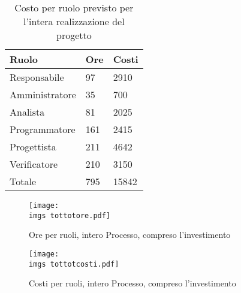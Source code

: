 {	
	\begin{table}[H]
	 \centering
	 \begin{tabular}{p{}p{}
		  	  		  				p{}}
	  \toprule Ruolo & Ore  & Costi \\
	  \midrule
	  Responsabile & 97  & 2910 \\
	  Amministratore & 35  & 700 \\
	  Analista & 81 & 2025 \\
	  Programmatore & 161  & 2415 \\
	  Progettista & 211  & 4642 \\
	  Verificatore & 210  & 3150 \\
	  \hline
	  Totale & 795  & 15842 \\
	  \bottomrule
	 \end{tabular}
	 \label{tab:costoinvestimento}
	 \caption{Costo per ruolo previsto per l’intera realizzazione del progetto}
	\end{table}
	
	\begin{figure}[H]
		\centering
		\texttt{[image: \\imgs tottotore.pdf]}
		\label{fig:oreinvestimento}
		\caption{Ore per ruoli, intero Processo, compreso l’investimento}
	\end{figure}
	\begin{figure}[H]
		\centering
		\texttt{[image: \\imgs tottotcosti.pdf]}
		\label{fig:costoinvestimento}
		\caption{Costi per ruoli, intero Processo, compreso l’investimento}
	\end{figure}
}
